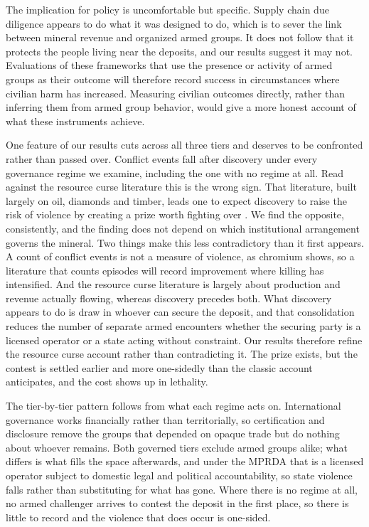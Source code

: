 \documentclass[11pt]{article}
\begin{document}
The implication for policy is uncomfortable but specific. Supply chain due diligence appears to do what it was designed to do, which is to sever the link between mineral revenue and organized armed groups. It does not follow that it protects the people living near the deposits, and our results suggest it may not. Evaluations of these frameworks that use the presence or activity of armed groups as their outcome will therefore record success in circumstances where civilian harm has increased. Measuring civilian outcomes directly, rather than inferring them from armed group behavior, would give a more honest account of what these instruments achieve.

One feature of our results cuts across all three tiers and deserves to be confronted rather than passed over. Conflict events fall after discovery under every governance regime we examine, including the one with no regime at all. Read against the resource curse literature this is the wrong sign. That literature, built largely on oil, diamonds and timber, leads one to expect discovery to raise the risk of violence by creating a prize worth fighting over \citep{ross2004does, collier2004greed, fearon2005primary, lujala2010spoils}. We find the opposite, consistently, and the finding does not depend on which institutional arrangement governs the mineral. Two things make this less contradictory than it first appears. A count of conflict events is not a measure of violence, as chromium shows, so a literature that counts episodes will record improvement where killing has intensified. And the resource curse literature is largely about production and revenue actually flowing, whereas discovery precedes both. What discovery appears to do is draw in whoever can secure the deposit, and that consolidation reduces the number of separate armed encounters whether the securing party is a licensed operator or a state acting without constraint. Our results therefore refine the resource curse account rather than contradicting it. The prize exists, but the contest is settled earlier and more one-sidedly than the classic account anticipates, and the cost shows up in lethality.

The tier-by-tier pattern follows from what each regime acts on. International governance works financially rather than territorially, so certification and disclosure remove the groups that depended on opaque trade but do nothing about whoever remains. Both governed tiers exclude armed groups alike; what differs is what fills the space afterwards, and under the MPRDA that is a licensed operator subject to domestic legal and political accountability, so state violence falls rather than substituting for what has gone. Where there is no regime at all, no armed challenger arrives to contest the deposit in the first place, so there is little to record and the violence that does occur is one-sided.
\end{document}
